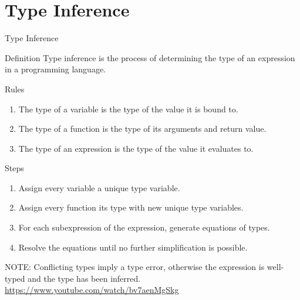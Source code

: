 \section{Type Inference}
\begin{frame}{Type Inference}
    \begin{block}{Definition}
        Type inference is the process of determining the type of an expression in a programming language.
    \end{block}
    \begin{block}{Rules}
        \begin{enumerate}
            \item The type of a variable is the type of the value it is bound to.
            \item The type of a function is the type of its arguments and return value.
            \item The type of an expression is the type of the value it evaluates to.
        \end{enumerate}
    \end{block}
\end{frame}
\begin{frame}
    \begin{block}{Steps}
        \begin{enumerate}
            \item Assign every variable a unique type variable.
            \item Assign every function its type with new unique type variables.
            \item For each subexpression of the expression, generate equations of types.
            \item Resolve the equations until no further simplification is possible.
        \end{enumerate}
        NOTE: Conflicting types imply a type error, otherwise the expression is well-typed and the type has been inferred.
        \url{https://www.youtube.com/watch/bv7aenMgSkg}
    \end{block}
\end{frame}